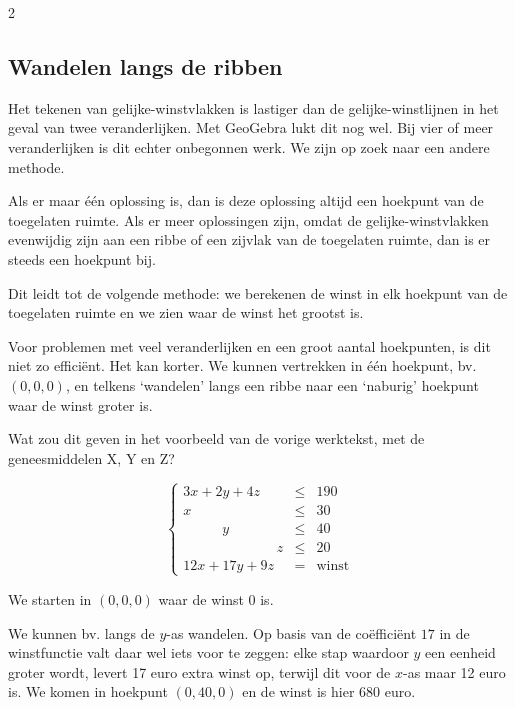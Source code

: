 \eindewerktekst

\begin{multicols}{2}
	
\subsection{Wandelen langs de ribben}
	
	Het tekenen van gelijke-winstvlakken is lastiger dan de gelijke-winstlijnen in het geval van twee veranderlijken. Met GeoGebra lukt dit nog wel. Bij vier of meer veranderlijken is dit echter onbegonnen werk. We zijn op zoek naar een andere methode.
	
	Als er maar één oplossing is, dan is deze oplossing altijd een hoekpunt van de toegelaten ruimte. Als er meer oplossingen zijn, omdat de gelijke-winstvlakken evenwijdig zijn aan een ribbe of een zijvlak van de toegelaten ruimte, dan is er steeds een hoekpunt bij.
	
	Dit leidt tot de volgende methode: we berekenen de winst in elk hoekpunt van de toegelaten ruimte en we zien waar de winst het grootst is.
	
	Voor problemen met veel veranderlijken en een groot aantal hoekpunten, is dit niet zo efficiënt. Het kan korter. We kunnen vertrekken in één hoekpunt, bv. $(0, 0, 0)$, en telkens `wandelen' langs een ribbe naar een `naburig' hoekpunt waar de winst groter is.
	
	
	Wat zou dit geven in het voorbeeld van de vorige werktekst, met de geneesmiddelen X, Y en Z?
	
	$$
	\left\{
	\begin{array}{ccl}
		
		3x+2y+4z  &\leq  &190 \\
		x\;\;\;\; \;\; \;\;\;\;\;\; \;\;\;\; \;\;   &\leq  &30\\
		\;\;\;\;\;\;\;\;	\;\;y \;\; \;\;\;\;\;\;     &\leq & 40\\
		\;\;\;\;\;\;\;\;\;\;\;\;\;\;\;\;\;\;\;\;	\;\;\;\;z       &\leq & 20\\
		12x+17y+9z &= & \text{winst}
		
	\end{array}
	\right.
	$$

	\begin{opsomming}
		\item We starten in $(0, 0, 0)$ waar de winst $0$ is. 
		\item We kunnen bv. langs de $y$-as wandelen. Op basis van de coëfficiënt $17$ in de winstfunctie valt daar wel iets voor te zeggen: elke stap waardoor $y$ een eenheid groter wordt, levert 17 euro extra winst op, terwijl dit voor de $x$-as maar 12 euro is. We komen in hoekpunt $(0, 40, 0)$ en de winst is hier 680 euro.
		

\end{opsomming}
\end{multicols}
